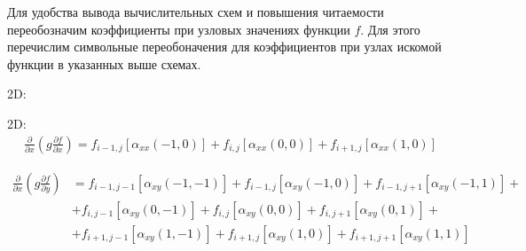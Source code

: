Для удобства вывода вычислительных схем и повышения
читаемости переобозначим коэффициенты при узловых значениях
функции $f$. Для этого перечислим символьные переобоначения
для коэффициентов при узлах искомой функции в указанных выше
схемах.

2D:
\begin{equation*}
    
\end{equation*}

2D:
\begin{equation*}
    \begin{split}
        \frac
            {\partial}
            {\partial x}
        \left(
            g
            \frac
                {\partial f}
                {\partial x}
        \right)
        =
        f_{i-1,j}
        \left[
            \alpha_{xx} \left(-1, 0\right)
        \right]
        +
        f_{i,j}
        \left[
            \alpha_{xx} \left(0, 0\right)
        \right]
        +
        f_{i+1,j}
        \left[
            \alpha_{xx} \left(1, 0\right)
        \right]
    \end{split}
\end{equation*}

\begin{equation*}
    \begin{split}
        \frac
            {\partial}
            {\partial x}
        \left(
            g
            \frac
                {\partial f}
                {\partial y}
        \right)
        &
        =
        f_{i-1, j-1}
        \left[
            \alpha_{xy} \left(-1, -1\right)
        \right]
        +
        f_{i-1,j}
        \left[
            \alpha_{xy} \left(-1, 0\right)
        \right]
        +
        f_{i-1, j+1}
        \left[
            \alpha_{xy} \left(-1, 1\right)
        \right]
        +
        \\
        &
        +
        f_{i, j-1}
        \left[
            \alpha_{xy} \left(0, -1\right)
        \right]
        +
        f_{i, j}
        \left[
            \alpha_{xy} \left(0, 0\right)
        \right]
        +
        f_{i, j+1}
        \left[
            \alpha_{xy} \left(0, 1\right)
        \right]
        +
        \\
        &
        +
        f_{i+1, j-1}
        \left[
            \alpha_{xy} \left(1, -1\right)
        \right]
        +
        f_{i+1, j}
        \left[
            \alpha_{xy} \left(1, 0\right)
        \right]
        +
        f_{i+1, j+1}
        \left[
            \alpha_{xy} \left(1, 1\right)
        \right]
    \end{split}
\end{equation*}

